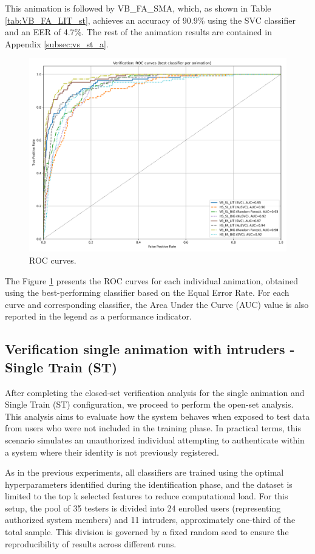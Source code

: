 \documentclass[12pt]{report}
\begin{document}
This animation is followed by VB\_FA\_SMA, which, as shown in Table \ref{tab:VB_FA_LIT_st}, achieves an accuracy of 90.9\% using the SVC classifier and an EER of 4.7\%.
The rest of the animation results are contained in Appendix \ref{subsec:vs_st_a}.

\begin{figure}[ht]
    \centering
    \includegraphics[width = 0.6
    \textwidth]{Images/Results/Verification_single/st/best_animation_roc_curves_st.png}
    \caption{ROC curves.}
    \label{fig:roc_st}
\end{figure}

The Figure \ref{fig:roc_st} presents the ROC curves for each individual animation, obtained using the best-performing classifier based on the Equal Error Rate.
For each curve and corresponding classifier, the Area Under the Curve (AUC) value is also reported in the legend as a performance indicator.
\FloatBarrier

\subsection{Verification single animation with intruders - Single Train (ST)}
\label{subsec:vsi}

After completing the closed-set verification analysis for the single animation and Single Train (ST) configuration, we proceed to perform the open-set analysis.
This analysis aims to evaluate how the system behaves when exposed to test data from users who were not included in the training phase.
In practical terms, this scenario simulates an unauthorized individual attempting to authenticate within a system where their identity is not previously registered.

As in the previous experiments, all classifiers are trained using the optimal hyperparameters identified during the identification phase, and the dataset is limited to the top k selected features to reduce computational load.
For this setup, the pool of 35 testers is divided into 24 enrolled users (representing authorized system members) and 11 intruders, approximately one-third of the total sample.
This division is governed by a fixed random seed to ensure the reproducibility of results across different runs.
\end{document}
